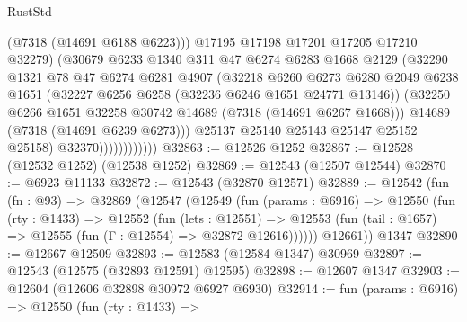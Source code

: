 \begin{lexlean}{RustStd}
\begin{coremodule}
                              (@7318 (@14691 @6188 @6223)))
                            @17195
                            @17198
                            @17201
                            @17205
                            @17210
                            @32279)
                          (@30679
                            @6233
                            @1340
                            @311
                            @47
                            @6274
                            @6283
                            @1668
                            @2129
                            (@32290
                              @1321
                              @78
                              @47
                              @6274
                              @6281
                              @4907
                              (@32218
                                @6260
                                @6273
                                @6280
                                @2049
                                @6238
                                @1651
                                (@32227 @6256 @6258 (@32236 @6246 @1651 @24771 @13146))
                                (@32250
                                  @6266
                                  @1651
                                  @32258
                                  @30742
                                  @14689
                                  (@7318 (@14691 @6267 @1668)))
                                @14689
                                (@7318 (@14691 @6239 @6273)))
                              @25137
                              @25140
                              @25143
                              @25147
                              @25152
                              @25158)
                            @32370))))))))))))
@32863 := @12526 @1252
@32867 := @12528 (@12532 @1252) (@12538 @1252)
@32869 := @12543 (@12507 @12544)
@32870 := @6923 @11133
@32872 := @12543 (@32870 @12571)
@32889 := @12542
    (fun (fn : @93) =>
    @32869
      (@12547
        (@12549
          (fun (params : @6916) =>
          @12550
            (fun (rty : @1433) =>
            @12552
              (fun (lets : @12551) =>
              @12553 (fun (tail : @1657) => @12555 (fun (Γ : @12554) => @32872 @12616))))))
        @12661))
    @1347
@32890 := @12667 @12509
@32893 := @12583 (@12584 @1347) @30969
@32897 := @12543 (@12575 (@32893 @12591) @12595)
@32898 := @12607 @1347
@32903 := @12604 (@12606 @32898 @30972 @6927 @6930)
@32914 := fun (params : @6916) =>
  @12550
    (fun (rty : @1433) =>

\end{coremodule}
\end{lexlean}
